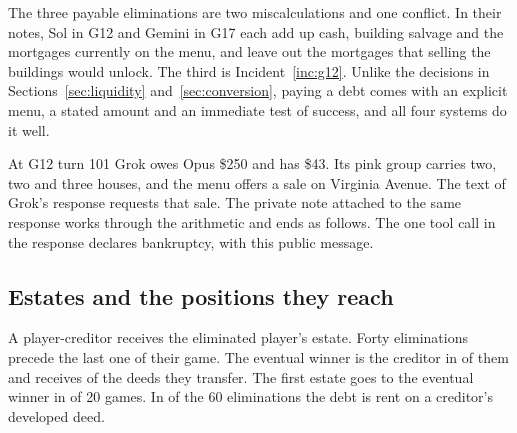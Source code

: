 The three payable eliminations are two miscalculations and one conflict. In their notes, Sol in G12 and Gemini in G17 each add up cash, building salvage and the mortgages currently on the menu, and leave out the mortgages that selling the buildings would unlock. The third is Incident~\ref{inc:g12}. Unlike the decisions in Sections~\ref{sec:liquidity} and~\ref{sec:conversion}, paying a debt comes with an explicit menu, a stated amount and an immediate test of success, and all four systems do it well.


At G12 turn 101 Grok owes Opus \$250 and has \$43. Its pink group carries two, two and three houses, and the menu offers a sale on Virginia Avenue. The text of Grok's response requests that sale.
The private note attached to the same response works through the arithmetic and ends as follows.
The one tool call in the response declares bankruptcy, with this public message.

\subsection{Estates and the positions they reach}

A player-creditor receives the eliminated player's estate. Forty eliminations precede the last one of their game. The eventual winner is the creditor in  of them and receives  of the  deeds they transfer. The first estate goes to the eventual winner in  of 20 games. In  of the 60 eliminations the debt is rent on a creditor's developed deed.

